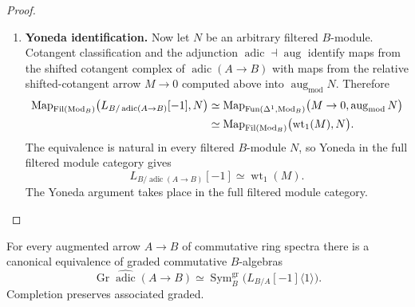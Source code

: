 \begin{proof}
\begin{enumerate}[label=\textup{(\arabic*)}]
    functor induced by \(\operatorname{aug}\) on tangent module categories is
    exactly \(\operatorname{aug}_{\mathrm{mod}}\).
    \item \textbf{Yoneda identification.}
    Now let \(N\) be an arbitrary filtered \(B\)-module. Cotangent
    classification and the adjunction \(\operatorname{adic}\dashv
    \operatorname{aug}\) identify maps from the shifted cotangent complex of
    \(\operatorname{adic}(A\to B)\) with maps from the relative shifted-cotangent arrow
    \(M\to0\) computed above into \(\operatorname{aug}_{\mathrm{mod}}N\).
    Therefore
    \[
    \begin{aligned}
        \operatorname{Map}_{\operatorname{Fil}(\operatorname{Mod}_B)}
        \bigl(L_{B/\operatorname{adic}(A\to B)}[-1],N\bigr)
        &\simeq
        \operatorname{Map}_{\operatorname{Fun}(\Delta^1,\operatorname{Mod}_B)}
        \bigl(M\to0,\operatorname{aug}_{\mathrm{mod}}N\bigr)
        \\
        &\simeq
        \operatorname{Map}_{\operatorname{Fil}(\operatorname{Mod}_B)}
        \bigl(\operatorname{wt}_1(M),N\bigr).
    \end{aligned}
    \]
    The equivalence is natural in every filtered \(B\)-module \(N\), so Yoneda in
    the full filtered module category gives
    \[
        L_{B/\operatorname{adic}(A\to B)}[-1]
        \simeq
        \operatorname{wt}_1(M).
    \]
    The Yoneda argument takes place in the full filtered module category.
\end{enumerate}
\end{proof}


\begin{theorem}
\label{thm:adic-associated-graded}
For every augmented arrow \(A\to B\) of commutative ring spectra there is a
canonical equivalence of graded commutative \(B\)-algebras
\[
    \operatorname{Gr}
    \widehat{\operatorname{adic}}(A\to B)
    \simeq
    \operatorname{Sym}^{\mathrm{gr}}_B
    \bigl(L_{B/A}[-1]\langle1\rangle\bigr).
\]
Completion preserves associated graded.
\end{theorem}

